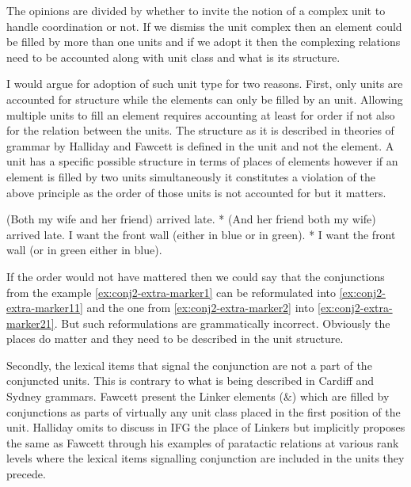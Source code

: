 The opinions are divided by whether to invite the notion of a complex unit to handle coordination or not. If we dismiss the unit complex then an element could be filled by more than one units and if we adopt it then the complexing relations need to be accounted along with unit class and what is its structure.

I would argue for adoption of such unit type for two reasons. First, only units are accounted for structure while the elements can only be filled by an unit. Allowing multiple units to fill an element requires accounting at least for order if not also for the relation between the units. The structure as it is described in theories of grammar by Halliday \citep{Halliday2002} and Fawcett \citep{Fawcett2000} is defined in the unit and not the element. A unit has a specific possible structure in terms of places of elements however if an element is filled by two units simultaneously it constitutes a violation of the above principle as the order of those units is not accounted for but it matters.
\begin{exe}
	\ex\label{ex:conj2-extra-marker1}
	(Both my wife and her friend) arrived late.  
	\ex\label{ex:conj2-extra-marker11} * (And her friend both my wife) arrived late.
	\ex\label{ex:conj2-extra-marker2}
	I want the front wall (either in blue or in green). 
	\ex\label{ex:conj2-extra-marker21}
	* I want the front wall (or in green either in blue). 
\end{exe}

If the order would not have mattered then we could say that the conjunctions from the example \ref{ex:conj2-extra-marker1} can be reformulated into \ref{ex:conj2-extra-marker11} and the one from \ref{ex:conj2-extra-marker2} into \ref{ex:conj2-extra-marker21}. But such reformulations are grammatically incorrect. Obviously the places do matter and they need to be described in the unit structure. 

Secondly, the lexical items that signal the conjunction are not a part of the conjuncted units. This is contrary to what is being described in Cardiff and Sydney grammars. Fawcett present the Linker elements (\&) which are filled by conjunctions as parts of virtually any unit class placed in the first position of the unit. Halliday omits to discuss in IFG \citep{Halliday2013} the place of Linkers but implicitly proposes the same as Fawcett through his examples of paratactic relations at various rank levels where the lexical items signalling conjunction are included in the units they precede.

